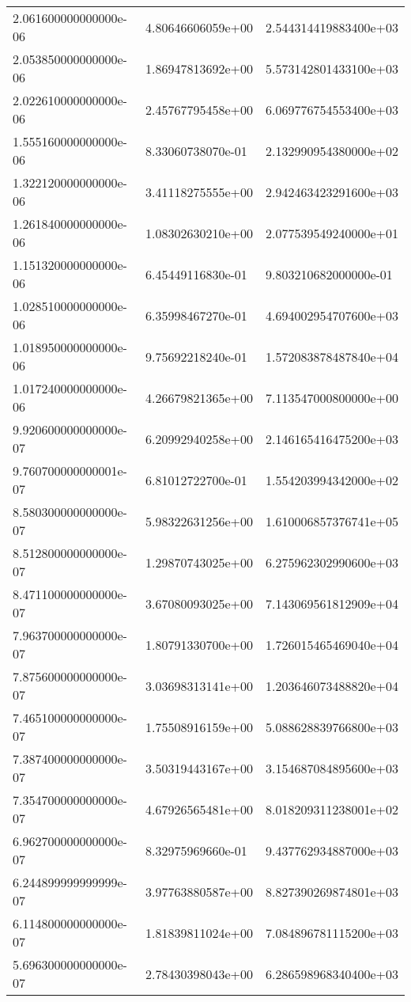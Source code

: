 \begin{center}
{\begin{xtabular}{|l|l|l|}
2.061600000000000e-06 & 4.80646606059e+00 & 2.544314419883400e+03 \\ 
2.053850000000000e-06 & 1.86947813692e+00 & 5.573142801433100e+03 \\ 
2.022610000000000e-06 & 2.45767795458e+00 & 6.069776754553400e+03 \\ 
1.555160000000000e-06 & 8.33060738070e-01 & 2.132990954380000e+02 \\ 
1.322120000000000e-06 & 3.41118275555e+00 & 2.942463423291600e+03 \\ 
1.261840000000000e-06 & 1.08302630210e+00 & 2.077539549240000e+01 \\ 
1.151320000000000e-06 & 6.45449116830e-01 & 9.803210682000000e-01 \\ 
1.028510000000000e-06 & 6.35998467270e-01 & 4.694002954707600e+03 \\ 
1.018950000000000e-06 & 9.75692218240e-01 & 1.572083878487840e+04 \\ 
1.017240000000000e-06 & 4.26679821365e+00 & 7.113547000800000e+00 \\ 
9.920600000000000e-07 & 6.20992940258e+00 & 2.146165416475200e+03 \\ 
9.760700000000001e-07 & 6.81012722700e-01 & 1.554203994342000e+02 \\ 
8.580300000000000e-07 & 5.98322631256e+00 & 1.610006857376741e+05 \\ 
8.512800000000000e-07 & 1.29870743025e+00 & 6.275962302990600e+03 \\ 
8.471100000000000e-07 & 3.67080093025e+00 & 7.143069561812909e+04 \\ 
7.963700000000000e-07 & 1.80791330700e+00 & 1.726015465469040e+04 \\ 
7.875600000000000e-07 & 3.03698313141e+00 & 1.203646073488820e+04 \\ 
7.465100000000000e-07 & 1.75508916159e+00 & 5.088628839766800e+03 \\ 
7.387400000000000e-07 & 3.50319443167e+00 & 3.154687084895600e+03 \\ 
7.354700000000000e-07 & 4.67926565481e+00 & 8.018209311238001e+02 \\ 
6.962700000000000e-07 & 8.32975969660e-01 & 9.437762934887000e+03 \\ 
6.244899999999999e-07 & 3.97763880587e+00 & 8.827390269874801e+03 \\ 
6.114800000000000e-07 & 1.81839811024e+00 & 7.084896781115200e+03 \\ 
5.696300000000000e-07 & 2.78430398043e+00 & 6.286598968340400e+03 \\ 

\end{xtabular}}
\end{center}
